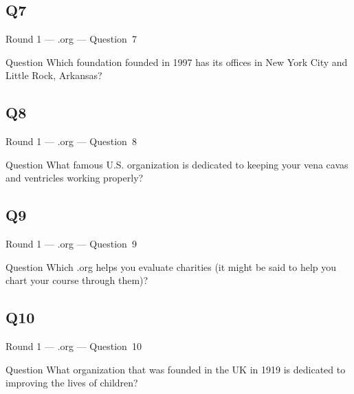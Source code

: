 \documentclass[11pt]{beamer}
\begin{document}
\subsection*{Q7}
\begin{frame}[t]{Round 1 --- .org --- \mbox{Question 7}}
\vspace{-0.5em}
\begin{block}{Question}
Which foundation founded in 1997 has its offices in New York City and Little Rock, Arkansas?
\end{block}
\end{frame}
\subsection*{Q8}
\begin{frame}[t]{Round 1 --- .org --- \mbox{Question 8}}
\vspace{-0.5em}
\begin{block}{Question}
What famous U.S. organization is dedicated to keeping your vena cavas and ventricles working properly?
\end{block}
\end{frame}
\subsection*{Q9}
\begin{frame}[t]{Round 1 --- .org --- \mbox{Question 9}}
\vspace{-0.5em}
\begin{block}{Question}
Which .org helps you evaluate charities (it might be said to help you chart your course through them)?
\end{block}
\end{frame}
\subsection*{Q10}
\begin{frame}[t]{Round 1 --- .org --- \mbox{Question 10}}
\vspace{-0.5em}
\begin{block}{Question}
What organization that was founded in the UK in 1919 is dedicated to improving the lives of children?
\end{block}
\end{frame}
\end{document}
